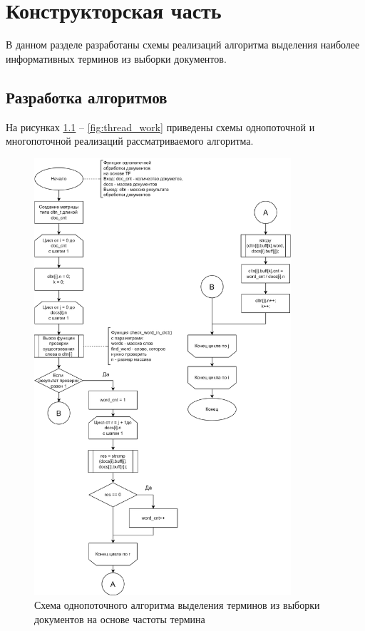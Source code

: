 \chapter{Конструкторская часть}

В данном разделе разработаны схемы реализаций алгоритма выделения наиболее информативных терминов из выборки документов.

\section{Разработка алгоритмов}

На рисунках \ref{fig:tf} -- \ref{fig:thread_work} приведены схемы однопоточной и многопоточной реализаций рассматриваемого алгоритма.

\begin{figure}[h]
	\centering
	\includegraphics[width=0.85\textwidth]{img/tf_alg.png}
	\caption{Схема однопоточного алгоритма выделения терминов из выборки документов на основе частоты термина}
	\label{fig:tf}
\end{figure}

